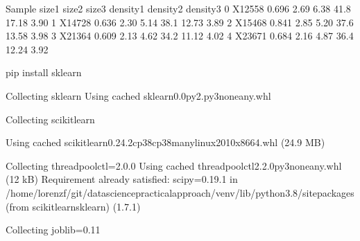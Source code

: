 \documentclass[letterpaper,10pt,english]{jupyterBook}
\begin{document}
\begin{sphinxVerbatim}[commandchars=\\\{\}]
   Sample  size1  size2  size3  density1  density2  density3
0  X12558  0.696   2.69   6.38      41.8     17.18      3.90
1  X14728  0.636   2.30   5.14      38.1     12.73      3.89
2  X15468  0.841   2.85   5.20      37.6     13.58      3.98
3  X21364  0.609   2.13   4.62      34.2     11.12      4.02
4  X23671  0.684   2.16   4.87      36.4     12.24      3.92
\end{sphinxVerbatim}

\begin{sphinxVerbatim}[commandchars=\\\{\}]
pip install sklearn
   
\end{sphinxVerbatim}

\begin{sphinxVerbatim}[commandchars=\\\{\}]
Collecting sklearn
  Using cached sklearn\PYGZhy{}0.0\PYGZhy{}py2.py3\PYGZhy{}none\PYGZhy{}any.whl
\end{sphinxVerbatim}

\begin{sphinxVerbatim}[commandchars=\\\{\}]
Collecting scikit\PYGZhy{}learn
\end{sphinxVerbatim}

\begin{sphinxVerbatim}[commandchars=\\\{\}]
  Using cached scikit\PYGZus{}learn\PYGZhy{}0.24.2\PYGZhy{}cp38\PYGZhy{}cp38\PYGZhy{}manylinux2010\PYGZus{}x86\PYGZus{}64.whl (24.9 MB)
\end{sphinxVerbatim}

\begin{sphinxVerbatim}[commandchars=\\\{\}]
Collecting threadpoolctl\PYGZgt{}=2.0.0
  Using cached threadpoolctl\PYGZhy{}2.2.0\PYGZhy{}py3\PYGZhy{}none\PYGZhy{}any.whl (12 kB)
Requirement already satisfied: scipy\PYGZgt{}=0.19.1 in /home/lorenzf/git/data\PYGZhy{}science\PYGZhy{}practical\PYGZhy{}approach/venv/lib/python3.8/site\PYGZhy{}packages (from scikit\PYGZhy{}learn\PYGZhy{}\PYGZgt{}sklearn) (1.7.1)
\end{sphinxVerbatim}

\begin{sphinxVerbatim}[commandchars=\\\{\}]
Collecting joblib\PYGZgt{}=0.11
\end{sphinxVerbatim}
\end{document}
